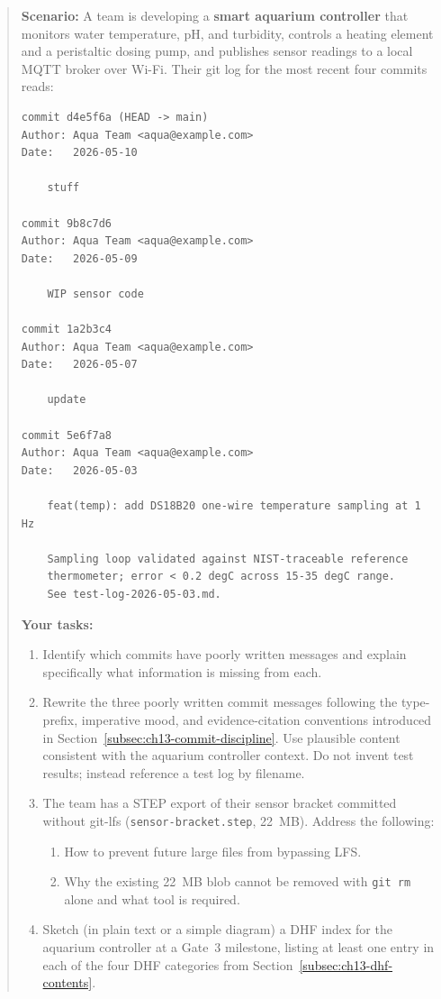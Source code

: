 \begin{quote}
\textbf{Scenario:} A team is developing a \textbf{smart aquarium controller} that monitors
water temperature, pH, and turbidity, controls a heating element and a peristaltic dosing
pump, and publishes sensor readings to a local MQTT broker over Wi-Fi.
Their git log for the most recent four commits reads:

\begin{verbatim}
commit d4e5f6a (HEAD -> main)
Author: Aqua Team <aqua@example.com>
Date:   2026-05-10

    stuff

commit 9b8c7d6
Author: Aqua Team <aqua@example.com>
Date:   2026-05-09

    WIP sensor code

commit 1a2b3c4
Author: Aqua Team <aqua@example.com>
Date:   2026-05-07

    update

commit 5e6f7a8
Author: Aqua Team <aqua@example.com>
Date:   2026-05-03

    feat(temp): add DS18B20 one-wire temperature sampling at 1 Hz

    Sampling loop validated against NIST-traceable reference
    thermometer; error < 0.2 degC across 15-35 degC range.
    See test-log-2026-05-03.md.
\end{verbatim}

\textbf{Your tasks:}
\begin{enumerate}
  \item Identify which commits have poorly written messages and explain specifically what
        information is missing from each.
  \item Rewrite the three poorly written commit messages following the type-prefix,
        imperative mood, and evidence-citation conventions introduced in
        Section~\ref{subsec:ch13-commit-discipline}.
        Use plausible content consistent with the aquarium controller context.
        Do not invent test results; instead reference a test log by filename.
  \item The team has a STEP export of their sensor bracket committed without git-lfs (\texttt{sensor-bracket.step}, 22~MB). Address the following:
  \begin{enumerate}
    \item[(a)] How to prevent future large files from bypassing LFS.
    \item[(b)] Why the existing 22~MB blob cannot be removed with \texttt{git rm} alone and what tool is required.
  \end{enumerate}
  \item Sketch (in plain text or a simple diagram) a DHF index for the aquarium controller
        at a Gate~3 milestone, listing at least one entry in each of the four DHF
        categories from Section~\ref{subsec:ch13-dhf-contents}.
\end{enumerate}
\end{quote}

